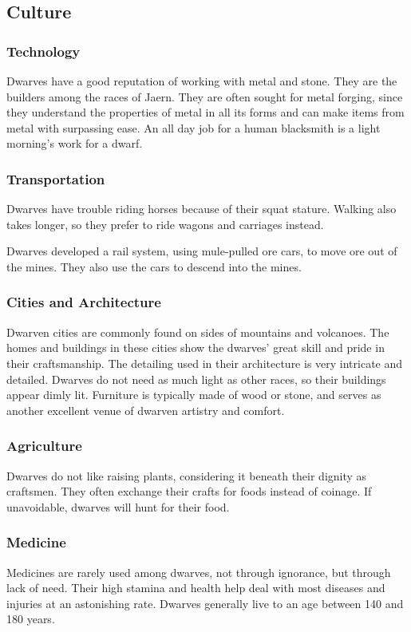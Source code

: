 \begin{multicols*}{2}
\subsection{Culture}
\subsubsection{Technology}
Dwarves have a good reputation of working with metal and stone. They are the builders among the races of Jaern. They are often sought for metal forging, since they understand the properties of metal in all its forms and can make items from metal with surpassing ease. An all day job for a human blacksmith is a light morning's work for a dwarf.
\subsubsection{Transportation}
Dwarves have trouble riding horses because of their squat stature. Walking also takes longer, so they prefer to ride wagons and carriages instead. 

Dwarves developed a rail system, using mule-pulled ore cars, to move ore out of the mines. They also use the cars to descend into the mines.
\subsubsection{Cities and Architecture}
Dwarven cities are commonly found on sides of mountains and volcanoes. The homes and buildings in these cities show the dwarves' great skill and pride in their craftsmanship. The detailing used in their architecture is very intricate and detailed. Dwarves do not need as much light as other races, so their buildings appear dimly lit. Furniture is typically made of wood or stone, and serves as another excellent venue of dwarven artistry and comfort.
\subsubsection{Agriculture}
Dwarves do not like raising plants, considering it beneath their dignity as craftsmen. They often exchange their crafts for foods instead of coinage. If unavoidable, dwarves will hunt for their food.
\subsubsection{Medicine}
Medicines are rarely used among dwarves, not through ignorance, but through lack of need. Their high stamina and health help deal with most diseases and injuries at an astonishing rate. Dwarves generally live to an age between 140 and 180 years.

\end{multicols*}
